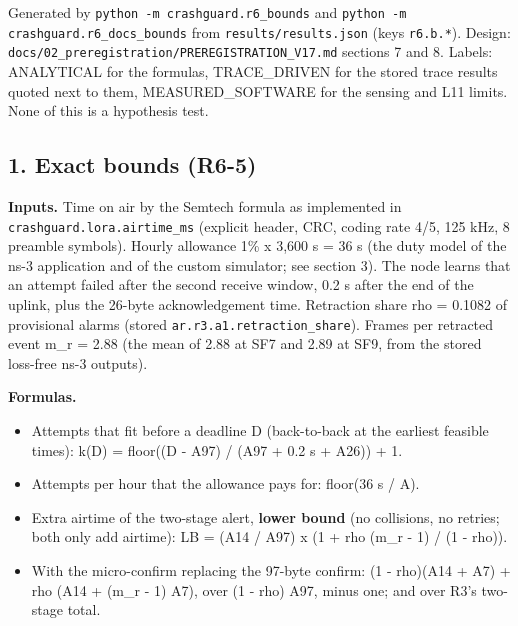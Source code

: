 


Generated by \texttt{python -m crashguard.r6\_bounds} and \texttt{python -m crashguard.r6\_docs\_bounds} from \texttt{results/results.json} (keys \texttt{r6.b.*}). Design: \texttt{docs/02\_preregistration/PREREGISTRATION\_V17.md} sections 7 and 8. Labels: ANALYTICAL for the formulas, TRACE\_DRIVEN for the stored trace results quoted next to them, MEASURED\_SOFTWARE for the sensing and L11 limits. None of this is a hypothesis test.

\subsection*{1. Exact bounds (R6-5)}

\textbf{Inputs.} Time on air by the Semtech formula as implemented in \texttt{crashguard.lora.airtime\_ms} (explicit header, CRC, coding rate 4/5, 125 kHz, 8 preamble symbols). Hourly allowance 1\% x 3,600 s = 36 s (the duty model of the ns-3 application and of the custom simulator; see section 3). The node learns that an attempt failed after the second receive window, 0.2 s after the end of the uplink, plus the 26-byte acknowledgement time. Retraction share rho = 0.1082 of provisional alarms (stored \texttt{ar.r3.a1.retraction\_share}). Frames per retracted event m\_r = 2.88 (the mean of 2.88 at SF7 and 2.89 at SF9, from the stored loss-free ns-3 outputs).

\textbf{Formulas.}
\begin{itemize}
\item Attempts that fit before a deadline D (back-to-back at the earliest feasible times): k(D) = floor((D - A97) / (A97 + 0.2 s + A26)) + 1.
\item Attempts per hour that the allowance pays for: floor(36 s / A).
\item Extra airtime of the two-stage alert, \textbf{lower bound} (no collisions, no retries; both only add airtime): LB = (A14 / A97) x (1 + rho (m\_r - 1) / (1 - rho)).
\item With the micro-confirm replacing the 97-byte confirm: (1 - rho)(A14 + A7) + rho (A14 + (m\_r - 1) A7), over (1 - rho) A97, minus one; and over R3's two-stage total.
\end{itemize}

